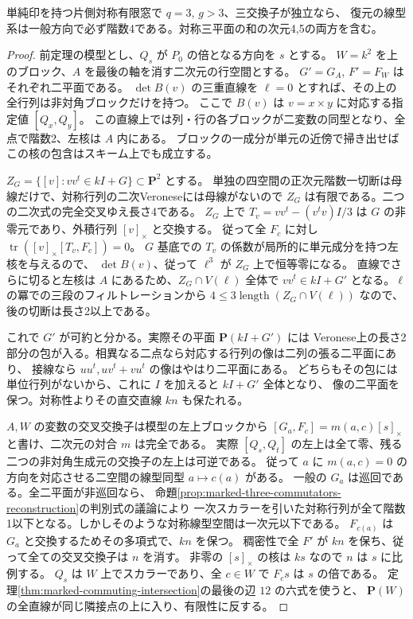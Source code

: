 \begin{corollary}\label{cor:no-persistent-defect-finite}
単純印を持つ片側対称有限窓で $q=3$, $g>3$、三交換子が独立なら、
復元の線型系は一般方向で必ず階数4である。対称三平面の和の次元4,5の両方を含む。
\end{corollary}
\begin{proof}
前定理の模型とし、$Q_s$ が $P_0$ の倍となる方向を $s$ とする。
$W=k^2$ を上のブロック、$A$ を最後の軸を消す二次元の行空間とする。
$G'=G_A$, $F'=F_W$ はそれぞれ二平面である。
$\det B(v)$ の三重直線を $\ell=0$ とすれば、その上の全行列は非対角ブロックだけを持つ。
ここで $B(v)$ は $v=x\times y$ に対応する指定値 $[Q_x,Q_y]$。
この直線上では列・行の各ブロックが二変数の同型となり、全点で階数2、左核は $A$ 内にある。
ブロックの一成分が単元の近傍で掃き出せばこの核の包含はスキーム上でも成立する。

$Z_G=\{[v]: vv^t\in kI+G\}\subset\mathbf P^2$ とする。
単独の四空間の正次元階数一切断は母線だけで、対称行列の二次Veroneseには母線がないので
$Z_G$ は有限である。二つの二次式の完全交叉ゆえ長さ4である。
$Z_G$ 上で $T_v=vv^t-(v^tv)I/3$ は $G$ の非零元であり、外積行列 $[v]_\times$ と交換する。
従って全 $F_c$ に対し $\operatorname{tr}([v]_\times[T_v,F_c])=0$。
$G$ 基底での $T_v$ の係数が局所的に単元成分を持つ左核を与えるので、
$\det B(v)$、従って $\ell^3$ が $Z_G$ 上で恒等零になる。
直線でさらに切ると左核は $A$ にあるため、$Z_G\cap V(\ell)$ 全体で
$vv^t\in kI+G'$ となる。$\ell$ の冪での三段のフィルトレーションから
$4\le3\operatorname{length}(Z_G\cap V(\ell))$ なので、後の切断は長さ2以上である。

これで $G'$ が可約と分かる。実際その平面 $\mathbf P(kI+G')$ には
Veronese上の長さ2部分の包が入る。相異なる二点なら対応する行列の像は二列の張る二平面にあり、
接線なら $uu^t,u v^t+v u^t$ の像はやはり二平面にある。
どちらもその包には単位行列がないから、これに $I$ を加えると $kI+G'$ 全体となり、
像の二平面を保つ。対称性よりその直交直線 $kn$ も保たれる。

$A,W$ の変数の交叉交換子は模型の左上ブロックから
$[G_a,F_c]=m(a,c)[s]_\times$ と書け、二次元の対合 $m$ は完全である。
実際 $[Q_s,Q_t]$ の左上は全て零、残る二つの非対角生成元の交換子の左上は可逆である。
従って $a$ に $m(a,c)=0$ の方向を対応させる二空間の線型同型 $a\mapsto c(a)$ がある。
一般の $G_a$ は巡回である。全二平面が非巡回なら、
命題\ref{prop:marked-three-commutators-reconstruction}の判別式の議論により
一次スカラーを引いた対称行列が全て階数1以下となる。しかしそのような対称線型空間は一次元以下である。
$F_{c(a)}$ は $G_a$ と交換するためその多項式で、$kn$ を保つ。
稠密性で全 $F'$ が $kn$ を保ち、従って全ての交叉交換子は $n$ を消す。
非零の $[s]_\times$ の核は $ks$ なので $n$ は $s$ に比例する。
$Q_s$ は $W$ 上でスカラーであり、全 $c\in W$ で $F_c s$ は $s$ の倍である。
定理\ref{thm:marked-commuting-intersection}の最後の辺 $12$ の六式を使うと、
$\mathbf P(W)$ の全直線が同じ隣接点の上に入り、有限性に反する。
\end{proof}

